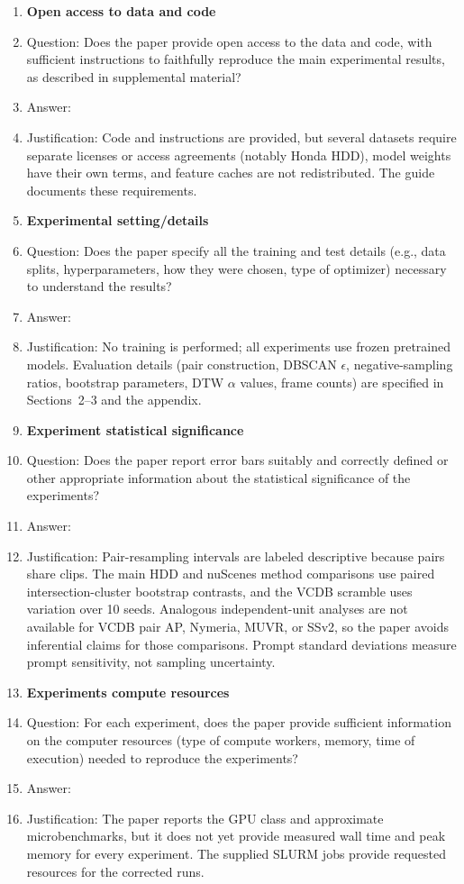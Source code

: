 \begin{enumerate}
\item {\bf Open access to data and code}
    \item[] Question: Does the paper provide open access to the data and code, with sufficient instructions to faithfully reproduce the main experimental results, as described in supplemental material?
    \item[] Answer: \answerNo{}
    \item[] Justification: Code and instructions are provided, but several datasets require separate licenses or access agreements (notably Honda HDD), model weights have their own terms, and feature caches are not redistributed. The guide documents these requirements.

\item {\bf Experimental setting/details}
    \item[] Question: Does the paper specify all the training and test details (e.g., data splits, hyperparameters, how they were chosen, type of optimizer) necessary to understand the results?
    \item[] Answer: \answerYes{}
    \item[] Justification: No training is performed; all experiments use frozen pretrained models. Evaluation details (pair construction, DBSCAN $\epsilon$, negative-sampling ratios, bootstrap parameters, DTW $\alpha$ values, frame counts) are specified in Sections~2--3 and the appendix.

\item {\bf Experiment statistical significance}
    \item[] Question: Does the paper report error bars suitably and correctly defined or other appropriate information about the statistical significance of the experiments?
    \item[] Answer: \answerNo{}
    \item[] Justification: Pair-resampling intervals are labeled descriptive because pairs share clips. The main HDD and nuScenes method comparisons use paired intersection-cluster bootstrap contrasts, and the VCDB scramble uses variation over 10 seeds. Analogous independent-unit analyses are not available for VCDB pair AP, Nymeria, MUVR, or SSv2, so the paper avoids inferential claims for those comparisons. Prompt standard deviations measure prompt sensitivity, not sampling uncertainty.

\item {\bf Experiments compute resources}
    \item[] Question: For each experiment, does the paper provide sufficient information on the computer resources (type of compute workers, memory, time of execution) needed to reproduce the experiments?
    \item[] Answer: \answerNo{}
    \item[] Justification: The paper reports the GPU class and approximate microbenchmarks, but it does not yet provide measured wall time and peak memory for every experiment. The supplied SLURM jobs provide requested resources for the corrected runs.


\end{enumerate}
